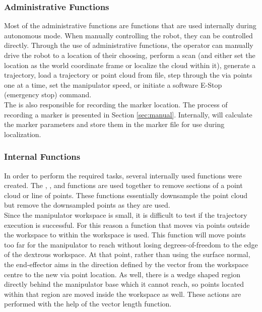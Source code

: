 \subsubsection{Administrative Functions}
\label{sub:admin}
Most of the administrative functions are functions that are used internally during autonomous mode. When manually controlling the robot, they can be controlled directly. Through the use of administrative functions, the operator can manually drive the robot to a location of their choosing, perform a scan (and either set the location as the world coordinate frame or localize the cloud within it), generate a trajectory, load a trajectory or point cloud from file, step through the via points one at a time, set the manipulator speed, or initiate a software E-Stop (emergency stop) command. \\

The  is also responsible for recording the marker location. The process of recording a marker is presented in Section \ref{sec:manual}. Internally,  will calculate the marker parameters and store them in the marker file for use during localization.\\
\subsubsection{Internal Functions}
In order to perform the required tasks, several internally used functions were created. The , , and  functions are used together to remove sections of a point cloud or line of points. These functions essentially downsample the point cloud but remove the downsampled points as they are used.\\

Since the manipulator workspace is small, it is difficult to test if the trajectory execution is successful. For this reason a function that moves via points outside the workspace to within the workspace is used. This function will move points too far for the manipulator to reach without losing degrees-of-freedom to the edge of the dextrous workspace. At that point, rather than using the surface normal, the end-effector aims in the direction defined by the vector from the workspace centre to the new via point location. As well, there is a wedge shaped region directly behind the manipulator base which it cannot reach, so points located within that region are moved inside the workspace as well. These actions are performed with the help of the vector length function.\\

